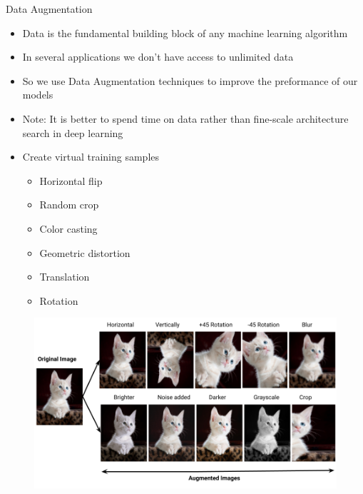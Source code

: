 \begin{frame}[allowframebreaks]{Data Augmentation}
\begin{itemize}
    \item Data is the fundamental building block of any machine learning algorithm
    \item In several applications we don't have access to unlimited data
    \item So we use Data Augmentation techniques to improve the preformance of our models
    \item Note: It is better to spend time on data rather than fine-scale architecture search in deep learning
\end{itemize}
\framebreak
\begin{itemize}
    \item Create virtual training samples
    \begin{itemize}
        \item Horizontal flip
        \item Random crop
        \item Color casting
        \item Geometric distortion
        \item Translation
        \item Rotation
    \end{itemize}
\end{itemize}
\framebreak
    \begin{figure}
    \centering
    \includegraphics[width=1.0\textwidth,height=1.0\textheight,keepaspectratio]{images/data_augmentation.png}
    \end{figure}
\framebreak
\begin{figure}
    \centering

\end{figure}
\end{frame}
